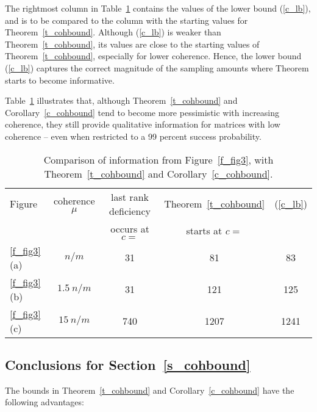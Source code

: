 \documentclass{siamltex}
\begin{document}
The rightmost column in Table~\ref{t_tab1} contains the values of the
lower bound (\ref{c_lb}), and is to be compared to the column 
with the starting values for Theorem~\ref{t_cohbound}.  Although
(\ref{c_lb}) is weaker than Theorem~\ref{t_cohbound}, its values are
close to the starting values of Theorem~\ref{t_cohbound},
especially for lower coherence.
Hence, the lower bound (\ref{c_lb}) captures
the correct magnitude of the sampling amounts where Theorem starts to
become informative.

Table~\ref{t_tab1} illustrates that, although Theorem~\ref{t_cohbound}
and Corollary~\ref{c_cohbound} tend to become more pessimistic with
increasing coherence, they still provide qualitative information for
matrices with low coherence -- even when restricted to a 99 percent
success probability.

\begin{table}
\begin{center}
\begin{tabular}{|l||c|c|c|c|}
\hline
Figure& coherence $\mu$ & last rank deficiency & Theorem~\ref{t_cohbound} 
& (\ref{c_lb})\\
& & occurs at $c=$ & starts at $c=$ & \\
\hline\hline
\ref{f_fig3}(a) & $n/m$ & 31 & 81 & 83 \\
\ref{f_fig3}(b) & $1.5\>n/m$ & 31 & 121 & 125\\
\ref{f_fig3}(c) & $15\>n/m$ & 740 & 1207 & 1241\\
\hline
\end{tabular}
\end{center}
\bigskip
\caption{Comparison of information from Figure~\ref{f_fig3},
with Theorem~\ref{t_cohbound} and 
Corollary~\ref{c_cohbound}.}\label{t_tab1}
\end{table}

\subsection{Conclusions for Section~\ref{s_cohbound}}\label{s_cohconc}
The bounds in Theorem~\ref{t_cohbound} and Corollary~\ref{c_cohbound}
have the following advantages:
\end{document}
